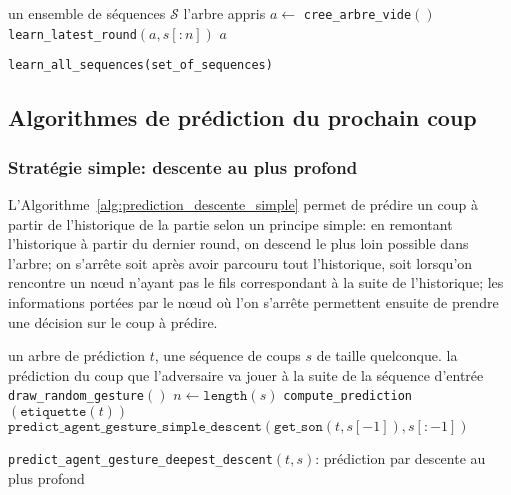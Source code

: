 \documentclass[10pt,a4paper]{article}
\theoremstyle{plain} %
\theoremstyle{definition} %
\theoremstyle{remark} %
\def\noeud{n\oe ud\xspace}
\begin{document}
\begin{algorithm}
\begin{algorithmic}[1]
\REQUIRE un ensemble de séquences $\mathcal{S}$
\ENSURE l'arbre appris
\STATE $a \leftarrow $ \verb+cree_arbre_vide+$()$
        \STATE \verb+learn_latest_round+$(a, s[:n] )$
    \ENDFOR
\ENDFOR
\RETURN $a$
\end{algorithmic}
\caption{\texttt{learn\_all\_sequences(set\_of\_sequences)}}
\label{alg:learn_all_sequences}
\end{algorithm}

\subsection{Algorithmes de prédiction du prochain coup}
\subsubsection{Stratégie simple: descente au plus profond}
L'Algorithme~\ref{alg:prediction_descente_simple} permet de prédire un coup à partir de l'historique de la partie selon un principe simple: en remontant l'historique à partir du dernier round, on descend le plus loin possible dans l'arbre;
on s'arrête soit après avoir parcouru tout l'historique, soit lorsqu'on rencontre un \noeud n'ayant pas le fils correspondant à la suite de l'historique;
les informations portées par le \noeud où l'on s'arrête permettent ensuite de prendre une décision sur le coup à prédire.

\begin{algorithm}
\begin{algorithmic}[1]
\REQUIRE un arbre de prédiction $t$, une séquence de coups $s$ de taille quelconque.
\ENSURE la prédiction du coup que l'adversaire va jouer à la suite de la séquence d'entrée
    \RETURN \verb+draw_random_gesture+$()$
\ENDIF
\STATE $n \leftarrow \texttt{length}(s)$
    \RETURN \verb+compute_prediction+$\left (\texttt{etiquette}\left (t\right )\right )$
\ENDIF
\RETURN $\texttt{predict_agent_gesture\_simple\_descent}\left (\texttt{get\_son} \left (t, s\left [-1\right ]\right ), s\left [:-1\right ]\right )$
\end{algorithmic}
\caption{\texttt{predict_agent_gesture\_deepest\_descent}$\left (t, s\right )$: prédiction par descente au plus profond}
\label{alg:prediction_descente_simple}
\end{algorithm}
\end{document}
